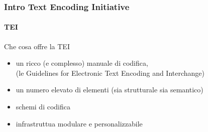 



\begin{frame}
	\frametitle{Intro Text Encoding Initiative}
	\framesubtitle{TEI}
	\addtocounter{nframe}{1}

	\begin{block}{Che cosa offre la TEI}
        \begin{itemize}
            \item un ricco (e complesso) manuale di codifica, 
            \\(le Guidelines for Electronic Text Encoding and Interchange)
            \item un numero elevato di elementi (sia strutturale sia semantico)
            \item schemi di codifica
            \item infrastruttua modulare e personalizzabile
        \end{itemize}

	\end{block}

\end{frame}





